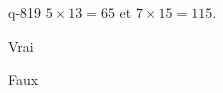 \begin{truefalse}{q-819}
$5\times 13 = 65$ et $7\times 15 = 115$.
\item Vrai
\item* Faux
\end{truefalse}

